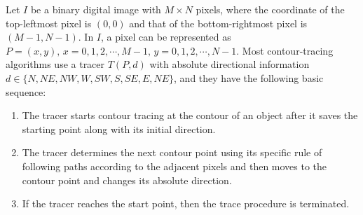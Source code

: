 \documentclass[sensors,article,accept,moreauthors,pdftex,10pt,a4paper]{mdpi}
\begin{document}

Let $I$
 be a binary digital image with $M \times N$ pixels, where the coordinate of the top-leftmost pixel is $(0, 0)$ and that of the bottom-rightmost pixel is $(M - 1, N - 1)$. In $I$, a pixel can be represented as $P = (x, y),\, x = 0,1,2,\cdots,M-1,\, y = 0,1,2,\cdots, N-1$. Most contour-tracing algorithms use a tracer $T (P, d)$ with absolute directional information $d\in\{N,NE,NW,W,SW,S,SE,E,NE\}$, and they have the following basic sequence: 


\begin{enumerate}[leftmargin=*,labelsep=5mm]
\item The tracer starts contour tracing at the contour of an object after it saves the starting point along with its initial direction. 
\item The tracer determines the next contour point using its specific rule of following paths according to the adjacent pixels and then moves to the contour point and changes its absolute direction.
\item If the tracer reaches the start point, then the trace procedure is terminated. 
\end{enumerate}
\end{document}
